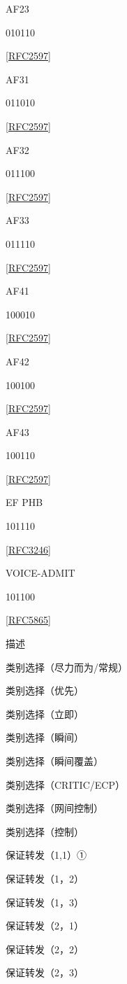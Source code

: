 AF23

010110

\href{https://www.rfc-editor.org/rfc/rfc2597}{[RFC2597]}

AF31

011010

\href{https://www.rfc-editor.org/rfc/rfc2597}{[RFC2597]}

AF32

011100

\href{https://www.rfc-editor.org/rfc/rfc2597}{[RFC2597]}

AF33

011110

\href{https://www.rfc-editor.org/rfc/rfc2597}{[RFC2597]}

AF41

100010

\href{https://www.rfc-editor.org/rfc/rfc2597}{[RFC2597]}

AF42

100100

\href{https://www.rfc-editor.org/rfc/rfc2597}{[RFC2597]}

AF43

100110

\href{https://www.rfc-editor.org/rfc/rfc2597}{[RFC2597]}

EF PHB

101110

\href{https://www.rfc-editor.org/rfc/rfc3246}{[RFC3246]}

VOICE-ADMIT

101100

\href{https://www.rfc-editor.org/rfc/rfc5865}{[RFC5865]}

描述

类别选择（尽力而为/常规）

类别选择（优先）

类别选择（立即）

类别选择（瞬间）

类别选择（瞬间覆盖）

类别选择（CRITIC/ECP）

类别选择（网间控制）

类别选择（控制）

保证转发（1,1）①

保证转发（1，2）

保证转发（1，3）

保证转发（2，1）

保证转发（2，2）

保证转发（2，3）


